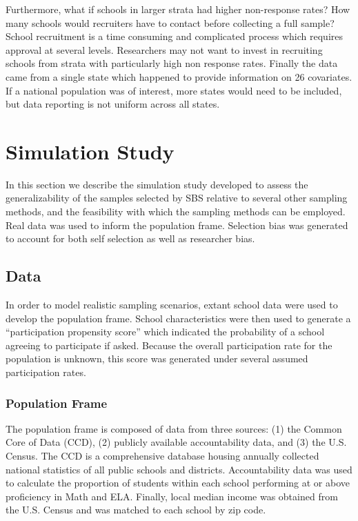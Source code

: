 \documentclass[man,floatsintext]{apa6}
\theoremstyle{definition}
\theoremstyle{definition}
\theoremstyle{definition}
\theoremstyle{remark}
\begin{document}
Furthermore, what if schools in larger strata had higher non-response
rates? How many schools would recruiters have to contact before
collecting a full sample? School recruitment is a time consuming and
complicated process which requires approval at several levels.
Researchers may not want to invest in recruiting schools from strata
with particularly high non response rates. Finally the data came from a
single state which happened to provide information on 26 covariates. If
a national population was of interest, more states would need to be
included, but data reporting is not uniform across all states.

\hypertarget{simulation-study}{%
\section{Simulation Study}\label{simulation-study}}

In this section we describe the simulation study developed to assess the
generalizability of the samples selected by SBS relative to several
other sampling methods, and the feasibility with which the sampling
methods can be employed. Real data was used to inform the population
frame. Selection bias was generated to account for both self selection
as well as researcher bias.

\hypertarget{data}{%
\subsection{Data}\label{data}}

In order to model realistic sampling scenarios, extant school data were
used to develop the population frame. School characteristics were then
used to generate a \enquote{participation propensity score} which
indicated the probability of a school agreeing to participate if asked.
Because the overall participation rate for the population is unknown,
this score was generated under several assumed participation rates.

\hypertarget{population-frame}{%
\subsubsection{Population Frame}\label{population-frame}}

The population frame is composed of data from three sources: (1) the
Common Core of Data (CCD), (2) publicly available accountability data,
and (3) the U.S. Census. The CCD is a comprehensive database housing
annually collected national statistics of all public schools and
districts. Accountability data was used to calculate the proportion of
students within each school performing at or above proficiency in Math
and ELA. Finally, local median income was obtained from the U.S. Census
and was matched to each school by zip code.
\end{document}

